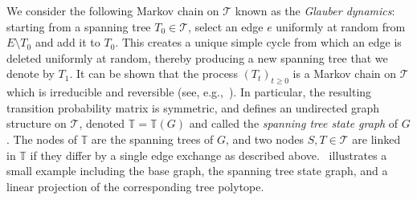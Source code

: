 \documentclass[11pt,a4paper]{article}
\newcommand{\setoftrees}{{\mathcal{T}}}
\newcommand{\stategraph}{{\mathbb{T}}}
\begin{document}
    We consider the following Markov chain on $\setoftrees$ known as the \emph{Glauber dynamics}: starting from a spanning tree $T_0\in\setoftrees$, select an edge $e$ uniformly at random from $E\setminus T_0$ and add it to $T_0$. This creates a unique simple cycle from which an edge is deleted uniformly at random, thereby producing a new spanning tree that we denote by $T_1$. It can be shown that the process $(T_t)_{t\ge 0}$ is a Markov chain on $\setoftrees$ which is irreducible and reversible (see, e.g.,~\cite{alev2020improved}). In particular, the resulting transition probability matrix is symmetric, and defines an undirected graph structure on $\setoftrees$, denoted $\stategraph=\stategraph(G)$ and called the \emph{spanning tree state graph} of $G$. The nodes of $\stategraph$ are the spanning trees of $G$, and two nodes $S,T\in\setoftrees$ are linked in $\stategraph$ if they differ by a single edge exchange as described above.~ illustrates a small example including the base graph, the spanning tree state graph, and a linear projection of the corresponding tree polytope.
\end{document}
